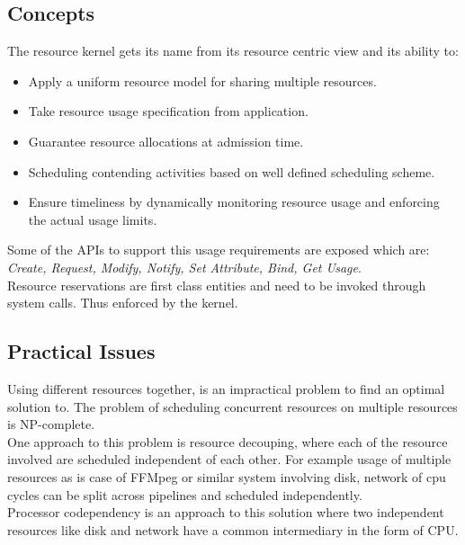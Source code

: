 \subsection*{Concepts}
The resource kernel gets its name from its resource centric view and its ability to:
\begin{itemize}
	\item Apply a uniform resource model for sharing multiple resources.
	\item Take resource usage specification from application.
	\item Guarantee resource allocations at admission time.
	\item Scheduling contending activities based on well defined scheduling scheme.
	\item Ensure timeliness by dynamically monitoring resource usage and enforcing the actual usage limits.
\end{itemize}
Some of the APIs to support this usage requirements are exposed which are: \textit{Create, Request, Modify, Notify, Set Attribute, Bind, Get Usage}.\\
Resource reservations are first class entities and need to be invoked through system calls. Thus enforced by the kernel.
\subsection*{Practical Issues}
Using different resources together, is an impractical problem to find an optimal solution to.
The problem of scheduling concurrent resources on multiple resources is NP-complete.\\
One approach to this problem is resource decouping, where each of the resource involved are scheduled independent of each other. For example usage of multiple resources as is case of FFMpeg or similar system involving disk, network of cpu cycles can be split across pipelines and scheduled independently.\\
Processor codependency is an approach to this solution where two independent resources like disk and network have a common intermediary in the form of CPU.